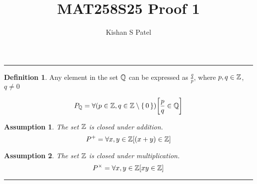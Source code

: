 \documentclass{exam}
\theoremstyle{plain}
\newtheorem{assumption}{Assumption}
\theoremstyle{definition}
\newtheorem{definition}{Definition}
\begin{document}
\title{MAT258S25 Proof 1}
\author{Kishan S Patel}
\maketitle

\renewcommand{\qedsymbol}{QED}

\noindent\rule{\textwidth}{1pt}

\begin{definition}
	Any element in the set ${\mathbb Q}$ can be expressed as $\frac{q}{p}$,
	where $p,q \in {\mathbb Z}$, $q \neq 0$

	$$P_{{\mathbb Q}} = \forall { \left(p \in {\mathbb Z}, q \in {{\mathbb Z}\setminus \set{0} }\right) } { \left[ { \frac{p}{q} \in {\mathbb Q}} \right] }$$
\end{definition}


\begin{assumption}
	The set ${\mathbb Z}$ is closed under addition.
	$$P^{+}=\forall x, y \in {\mathbb Z} { \left[ { (x+y) \in {\mathbb Z}} \right] }$$
\end{assumption}

\begin{assumption}
	The set ${\mathbb Z}$ is closed under multiplication.
	$$P^{\times} = \forall x, y \in {\mathbb Z} { \left[ { xy \in {\mathbb Z}} \right] }$$
\end{assumption}

\noindent\rule{\textwidth}{1pt}

\begin{questions}
	
	
\end{questions}
\end{document}
